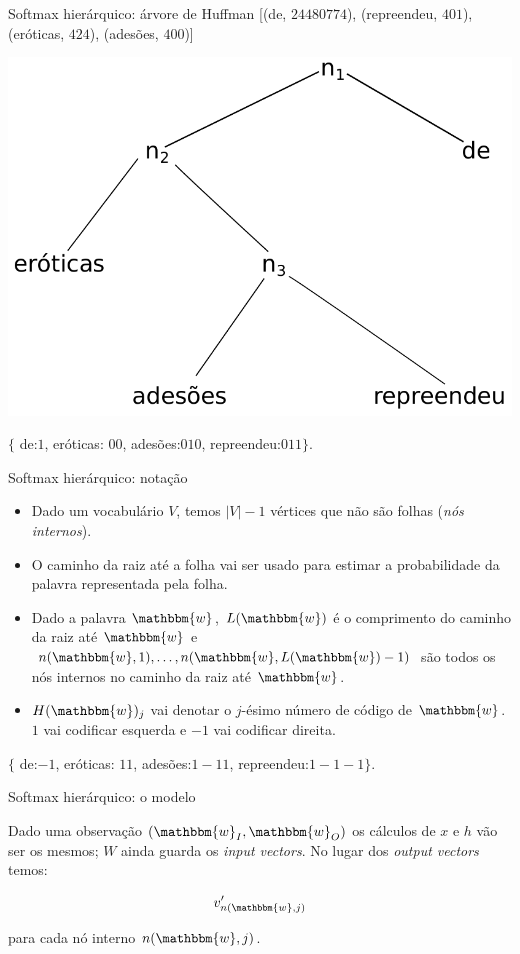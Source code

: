 \documentclass{beamer}
\newcommand{\wo}{\mathbbm{w}}
\begin{document}
\begin{frame}[fragile]{Softmax hierárquico: árvore de Huffman}
[(de, $24480774$), (repreendeu, $401$), (eróticas, $424$), (adesões, $400$)] 

\begin{center}
\includegraphics[scale=0.5]{tree.pdf}
\end{center}
$\{$ de:$1$, eróticas: $00$, adesões:$010$, repreendeu:$011 \}$. 

\end{frame}

\begin{frame}[fragile]{Softmax hierárquico: notação}
\begin{itemize}
\item Dado um vocabulário $V$, temos $|V|-1$ vértices que não são folhas (\textit{nós internos}). 
\item O caminho da raiz até a folha vai ser usado para estimar a probabilidade da palavra representada pela folha.
\item  Dado a palavra $\wo$, $L(\wo)$ é o comprimento do caminho da raiz até $\wo$  e $n(\wo,1), \dots, n(\wo, L(\wo)-1)$ são todos os nós internos no caminho da raiz até $\wo$.\
\item $H(\wo)_j$ vai denotar o $j$-ésimo número de código de $\wo$. $1$ vai codificar esquerda e $-1$ vai codificar direita.
\end{itemize}
$\{$ de:$-1$, eróticas: $11$, adesões:$1-11$, repreendeu:$1-1-1 \}$. 
\end{frame}

\begin{frame}[fragile]{Softmax hierárquico: o modelo}

Dado uma observação $(\wo_I,\wo_O)$ os cálculos de $x$ e $h$ vão ser os mesmos; $W$ ainda guarda os \textit{input vectors}. No lugar dos \textit{output vectors} temos: 

\vspace{0.2cm}

\[
v^{\prime}_{n(\wo,j)} 
\]

\vspace{0.2cm}

para cada nó interno $n(\wo,j)$.

\end{frame}
\end{document}
